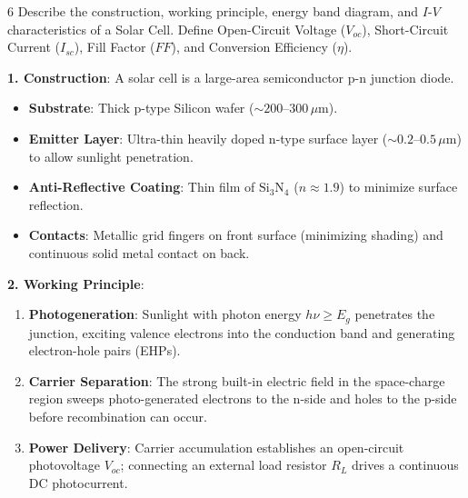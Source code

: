 \begin{theoryq}{6}
Describe the construction, working principle, energy band diagram, and $I$-$V$ characteristics of a Solar Cell. Define Open-Circuit Voltage ($V_{oc}$), Short-Circuit Current ($I_{sc}$), Fill Factor ($FF$), and Conversion Efficiency ($\eta$).
\end{theoryq}
\begin{theorysol}
\textbf{1. Construction}:
A solar cell is a large-area semiconductor p-n junction diode.
\begin{itemize}
    \item \textbf{Substrate}: Thick p-type Silicon wafer ($\sim 200\text{--}300\,\mu\text{m}$).
    \item \textbf{Emitter Layer}: Ultra-thin heavily doped n-type surface layer ($\sim 0.2\text{--}0.5\,\mu\text{m}$) to allow sunlight penetration.
    \item \textbf{Anti-Reflective Coating}: Thin film of $\text{Si}_3\text{N}_4$ ($n \approx 1.9$) to minimize surface reflection.
    \item \textbf{Contacts}: Metallic grid fingers on front surface (minimizing shading) and continuous solid metal contact on back.
\end{itemize}

\textbf{2. Working Principle}:
\begin{enumerate}
    \item \textbf{Photogeneration}: Sunlight with photon energy $h\nu \ge E_g$ penetrates the junction, exciting valence electrons into the conduction band and generating electron-hole pairs (EHPs).
    \item \textbf{Carrier Separation}: The strong built-in electric field in the space-charge region sweeps photo-generated electrons to the n-side and holes to the p-side before recombination can occur.
    \item \textbf{Power Delivery}: Carrier accumulation establishes an open-circuit photovoltage $V_{oc}$; connecting an external load resistor $R_L$ drives a continuous DC photocurrent.
\end{enumerate}


\end{theorysol}
